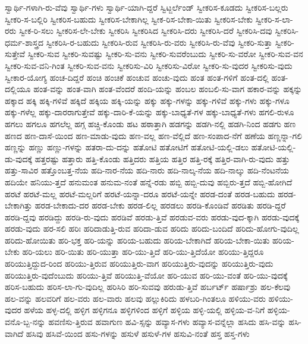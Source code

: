{ಸ್ವಾರ್ಥಿ-ಗಳಾಗಿ-ರು-ವೆವು
ಸ್ವಾರ್ಥಿ-ಗಳು
ಸ್ವಾರ್ಥಿ-ಯಾಗಿ-ದ್ದರೆ
ಸ್ವಿಟ್ಜರ್ಲೆಂಡ್
ಸ್ವೀಕರಿಸ-ಕೂಡದು
ಸ್ವೀಕರಿಸ-ಬಲ್ಲರು
ಸ್ವೀಕರಿ-ಸ-ಬಲ್ಲಿರಿ
ಸ್ವೀಕರಿಸ-ಬಹುದು
ಸ್ವೀಕರಿಸ-ಬೇಕಾಗಿಲ್ಲ
ಸ್ವೀಕ-ರಿಸ-ಬೇಕಾ-ಯಿತು
ಸ್ವೀಕರಿಸ-ಬೇಕು
ಸ್ವೀಕರಿ-ಸ-ಲಾ-ರರು
ಸ್ವೀಕ-ರಿ-ಸಲು
ಸ್ವೀಕರಿಸ-ಲೇ-ಬೇಕು
ಸ್ವೀಕರಿಸಿ
ಸ್ವೀಕರಿಸಿದ
ಸ್ವೀಕರಿಸಿ-ದರು
ಸ್ವೀಕರಿಸಿ-ದರೆ
ಸ್ವೀಕರಿಸಿ-ದವು
ಸ್ವೀಕರಿಸಿ-ಧರ್ಮ-ಶಾಸ್ತ್ರದ
ಸ್ವೀಕರಿಸಿ-ರ-ಬಹುದು
ಸ್ವೀಕರಿಸಿ-ರುವ
ಸ್ವೀಕರಿಸಿ-ರು-ವರು
ಸ್ವೀಕರಿಸಿ-ರು-ವೆವು
ಸ್ವೀಕರಿ-ಸುತ್ತಾ
ಸ್ವೀಕರಿ-ಸುತ್ತೇವೆ
ಸ್ವೀಕರಿ-ಸುವ
ಸ್ವೀಕರಿ-ಸುವಷ್ಟು
ಸ್ವೀಕರಿ-ಸು-ವನು
ಸ್ವೀಕರಿ-ಸುವರೆಂಬುದು
ಸ್ವೀಕರಿ-ಸು-ವರೋ
ಸ್ವೀಕರಿ-ಸುವ-ವನ
ಸ್ವೀಕರಿ-ಸುವ-ವನಿ-ಗಿಂತ
ಸ್ವೀಕರಿ-ಸುವ-ವನು
ಸ್ವೀಕರಿಸು-ವಿರಿ
ಸ್ವೀಕರಿಸು-ವಿರೋ
ಸ್ವೀಕರಿ-ಸು-ವುದರ
ಸ್ವೀಕರಿಸು-ವುದು
ಸ್ವೀಕಾರ-ಯೋಗ್ಯ
ಹಂಚ-ದಿದ್ದರೆ
ಹಂಚಿ
ಹಂಚಿಕೆ
ಹಂಚುವ
ಹಂಚು-ವುದು
ಹಂತ
ಹಂತ-ಗಳಿಗೆ
ಹಂತ-ದಲ್ಲಿ
ಹಂತ-ದಲ್ಲಿಯೂ
ಹಂತ-ವನ್ನು
ಹಂತ-ವಾಗಿ
ಹಂತ-ವೆಂದರೆ
ಹಂದಿ-ಯನ್ನು
ಹಂಬಲ
ಹಂಬಲಿ-ಸು-ವಾಗ
ಹಕಾರ-ವನ್ನು
ಹಕ್ಕನ್ನು
ಹಕ್ಕಾದ
ಹಕ್ಕಿ
ಹಕ್ಕಿ-ಗಳಿವೆ
ಹಕ್ಕಿದೆ
ಹಕ್ಕಿಯ
ಹಕ್ಕಿ-ಯನ್ನು
ಹಕ್ಕು
ಹಕ್ಕು-ಗಳನ್ನು
ಹಕ್ಕು-ಗಳಿವೆ
ಹಕ್ಕು-ಗಳು
ಹಕ್ಕು-ಗಳೂ
ಹಕ್ಕು-ಗಳೆಲ್ಲ
ಹಕ್ಕು-ದಾರರಾಗುತ್ತೇವೆ
ಹಕ್ಕು-ದಾರಿ-ಕೆ-ಯನ್ನು
ಹಕ್ಕು-ಬಾಧ್ಯತೆ-ಗಳ
ಹಕ್ಕು-ಬಾಧ್ಯತೆ-ಗಳು
ಹಗಲಿ-ರುಳೂ
ಹಗಲು
ಹಗಲೂ
ಹಗಲೆಲ್ಲ
ಹಗ್ಗ
ಹಚ್ಚಿ-ಕೊಂಡು
ಹಟ
ಹಠಾತ್ತಾಗಿ
ಹಡಗನ್ನು
ಹಡಗಿ-ನಲ್ಲಿ
ಹಡಗಿ-ನಿಂದ
ಹಡಗು
ಹಣ
ಹಣದ
ಹಣ-ದಾಸೆ-ಯಿಂದ
ಹಣ-ಮಾಡು-ವುದು
ಹಣ-ವಲ್ಲ
ಹಣ-ವೆಲ್ಲಿದೆ
ಹಣ-ಸಂಪಾದ-ನೆಗೆ
ಹಣೆಯ
ಹಣ್ಣನ್ನಾ-ಗಲಿ
ಹಣ್ಣನ್ನು
ಹಣ್ಣು
ಹಣ್ಣು-ಗಳನ್ನು
ಹತರಾ-ದು-ದನ್ನು
ಹತೋಟಿ
ಹತೋಟಿಗೆ
ಹತೋಟಿ-ಯಲ್ಲಿ-ಡಲು
ಹತೋಟಿ-ಯಲ್ಲಿ-ಡು-ವುದಕ್ಕೆ
ಹತ್ತರಷ್ಟು
ಹತ್ತಾರು
ಹತ್ತಿ-ಕೊಂಡು
ಹತ್ತಿದರು
ಹತ್ತಿಯ
ಹತ್ತಿರ
ಹತ್ತಿ-ರಕ್ಕೆ
ಹತ್ತಿರ-ವಾಗಿ-ರು-ವುದು
ಹತ್ತು
ಹತ್ತು-ಸಾವಿರ
ಹತ್ತೊಂಬತ್ತ-ನೆಯ
ಹದಿ-ನಾರ-ನೆಯ
ಹದಿ-ನಾರು
ಹದಿ-ನಾಲ್ಕ-ನೆಯ
ಹದಿ-ನಾಲ್ಕು
ಹದಿ-ನೆಂಟನೆಯ
ಹದಿಯೇ
ಹನಿಯು-ತ್ತದೆ
ಹನುಮಂತ
ಹನುಮ-ನಂತೆ
ಹನ್ನೆ-ರಡು
ಹಬ್ಬಿ
ಹಬ್ಬಿ-ದುವು
ಹಬ್ಬಿರು-ತ್ತದೆ
ಹಬ್ಬಿ-ಹೋಗಿದೆ
ಹರಟೆ
ಹರಟೆ-ಮಲ್ಲ
ಹರಟೆ-ಮಲ್ಲರಿಗೆ
ಹರಟೆ-ಯನ್ನಾ-ದರೂ
ಹರಟೆ-ಯನ್ನೇ
ಹರಡ-ದಂತೆ
ಹರಡ-ಬಹುದು
ಹರಡ-ಬೇಕಾಗಿತ್ತು
ಹರಡ-ಬೇಕಾದು-ದರ
ಹರಡ-ಬೇಕು
ಹರಡ-ಲಿಲ್ಲ
ಹರಡಲು
ಹರಡಿ-ಕೊಂಡಿವೆ
ಹರಡಿತು
ಹರಡಿ-ದ್ದರೆ
ಹರಡಿ-ದ್ದವು
ಹರಡಿದ್ದು
ಹರಡಿ-ರು-ವುದು
ಹರಡಿವೆ
ಹರಡು-ತ್ತಿವೆ
ಹರಡುವ-ವರು
ಹರಡು-ವುದ-ಕ್ಕಾಗಿ
ಹರಡು-ವುದಕ್ಕೆ
ಹರಡು-ವುದು
ಹರ-ಸಲಿ
ಹರಿಃ
ಹರಿದಾಡುತ್ತಿ-ರುವ
ಹರಿದಾ-ಡುವ
ಹರಿದು
ಹರಿದು-ಬಂದಿದೆ
ಹರಿದು-ಹೋಗು-ವುದಿಲ್ಲ
ಹರಿದು-ಹೋಯಿತು
ಹರಿ-ಭಕ್ತ
ಹರಿ-ಯನ್ನು
ಹರಿಯ-ಬಹುದು
ಹರಿಯ-ಬೇಕಾಗಿದೆ
ಹರಿಯ-ಬೇಕಾ-ಯಿತು
ಹರಿಯ-ಬೇಕು
ಹರಿ-ಯಲು
ಹರಿ-ಯಿತು
ಹರಿ-ಯುತ್ತಾ
ಹರಿ-ಯು-ತ್ತಿದೆ
ಹರಿ-ಯು-ತ್ತಿದೆಯೋ
ಹರಿಯು-ತ್ತಿದ್ದರೂ
ಹರಿಯುತ್ತಿದ್ದುದ-ರಿಂದ
ಹರಿಯು-ತ್ತಿರುವ
ಹರಿಯುತ್ತಿರು-ವಾಗ
ಹರಿಯುತ್ತಿರು-ವುದನ್ನು
ಹರಿಯುತ್ತಿರು-ವುದು
ಹರಿಯುತ್ತಿರು-ವುದೆಂಬುದು
ಹರಿಯು-ತ್ತಿವೆ
ಹರಿಯುತ್ತಿ-ವೆಯೋ
ಹರಿ-ಯುವ
ಹರಿ-ಯು-ವಂತೆ
ಹರಿ-ಯು-ವುದಕ್ಕೆ
ಹರಿಸ-ಬಹುದು
ಹರಿಸ-ಲಾ-ಗು-ವುದಿಲ್ಲ
ಹರಿಸಿರಿ
ಹರಿ-ಸುವವು
ಹರುಡು-ತ್ತಿವೆ
ಹರ್ಬರ್ಟ್
ಹರ್ಷಾಶ್ರು
ಹಲ-ಕೆಲವು
ಹಲ-ವನ್ನು
ಹಲವರಿಗೆ
ಹಲ-ವರು
ಹಲ-ವಾರು
ಹಲವು
ಹಲ್ಲುಕಿರಿದು
ಹಳಬರಿ-ಗಿಂತಲೂ
ಹಳಿಯು-ವರು
ಹಳಿಯು-ವುದರ
ಹಳೆಯ
ಹಳ್ಳ-ದಲ್ಲಿ
ಹಳ್ಳಿಗ
ಹಳ್ಳಿಗನೂ
ಹಳ್ಳಿಗಳಿಂದ
ಹಳ್ಳಿಗೆ
ಹಳ್ಳಿಯ
ಹಳ್ಳಿ-ಯಲ್ಲಿ
ಹಳ್ಳಿಯ-ವ-ನಿಗೆ
ಹಳ್ಳಿಯ-ವನೊ-ಬ್ಬ-ನನ್ನು
ಹವಣಿಸು-ತ್ತಿರುವ
ಹವಾಗುಣ
ಹವಿ-ಸ್ಸನ್ನು
ಹವ್ಯಾಸ-ಗಳು
ಹವ್ಯಾಸ-ವನ್ನೆಲ್ಲಾ
ಹಸಿದು
ಹಸಿ-ವನ್ನು
ಹಸಿ-ವಾಗಿದೆ
ಹಸಿವು
ಹಸಿವೆ-ಯಿಂದ
ಹಸು-ಗಳನ್ನು
ಹಸುಳೆ
ಹಸುಳೆ-ಗಳ
ಹಸುವಿ-ನಂತೆ
ಹಸ್ತ
ಹಸ್ತ-ಗಳು
}
